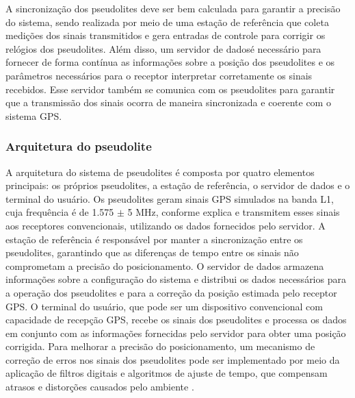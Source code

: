 A sincronização dos pseudolites deve ser bem calculada para garantir a precisão do sistema, sendo realizada por meio de uma estação de referência que coleta medições dos sinais transmitidos e gera entradas de controle para corrigir os relógios dos pseudolites. Além disso, um servidor de dadosé necessário para fornecer de forma contínua as informações sobre a posição dos pseudolites e os parâmetros necessários para o receptor interpretar corretamente os sinais recebidos. Esse servidor também se comunica com os pseudolites para garantir que a transmissão dos sinais ocorra de maneira sincronizada e coerente com o sistema GPS.

\subsubsection{Arquitetura do pseudolite}

A arquitetura do sistema de pseudolites é composta por quatro elementos principais: os próprios pseudolites, a estação de referência, o servidor de dados e o terminal do usuário. Os pseudolites geram sinais GPS simulados na banda L1, cuja frequência é de 1.575 $\pm$ 5 MHz, conforme explica \cite{wang2018} e transmitem esses sinais aos receptores convencionais, utilizando os dados fornecidos pelo servidor.
A estação de referência é responsável por manter a sincronização entre os pseudolites, garantindo que as diferenças de tempo entre os sinais não comprometam a precisão do posicionamento. O servidor de dados armazena informações sobre a configuração do sistema e distribui os dados necessários para a operação dos pseudolites e para a correção da posição estimada pelo receptor GPS. O terminal do usuário, que pode ser um dispositivo convencional com capacidade de recepção GPS, recebe os sinais dos pseudolites e processa os dados em conjunto com as informações fornecidas pelo servidor para obter uma posição corrigida.
Para melhorar a precisão do posicionamento, um mecanismo de correção de erros nos sinais dos pseudolites pode ser implementado por meio da aplicação de filtros digitais e algoritmos de ajuste de tempo, que compensam atrasos e distorções causados pelo ambiente \cite{kim2014}.
